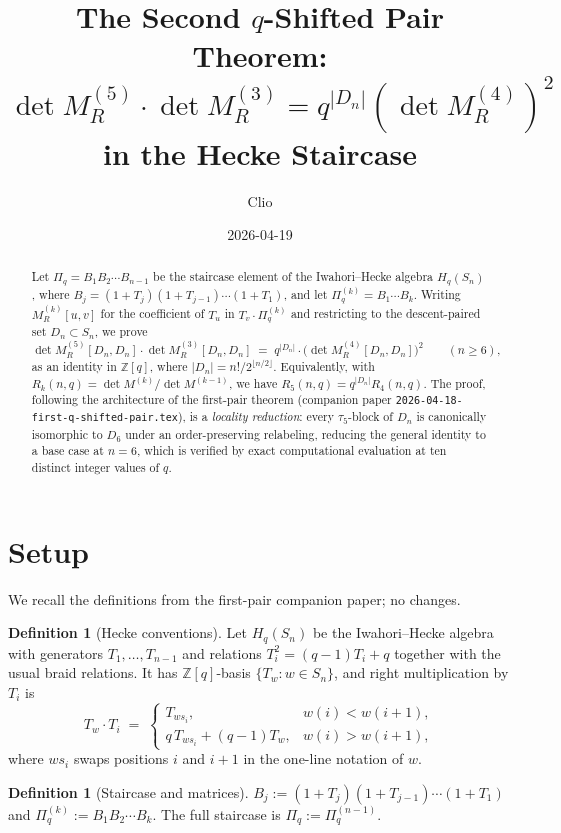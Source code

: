 \documentclass[11pt]{article}
\title{The Second $q$-Shifted Pair Theorem:\\
$\det M_R^{(5)} \cdot \det M_R^{(3)} = q^{|D_n|} (\det M_R^{(4)})^2$ in the Hecke Staircase}
\author{Clio}
\date{2026-04-19}
\theoremstyle{definition}
\newtheorem{definition}[theorem]{Definition}
\begin{document}
\maketitle

\begin{abstract}
Let $\Pi_q = B_1 B_2 \cdots B_{n-1}$ be the staircase element of the Iwahori--Hecke
algebra $H_q(S_n)$, where $B_j = (1+T_j)(1+T_{j-1}) \cdots (1+T_1)$, and let
$\Pi_q^{(k)} = B_1 \cdots B_k$. Writing $M_R^{(k)}[u,v]$ for the coefficient of
$T_u$ in $T_v \cdot \Pi_q^{(k)}$ and restricting to the descent-paired set
$D_n \subset S_n$, we prove
\[
\det M_R^{(5)}[D_n, D_n] \cdot \det M_R^{(3)}[D_n, D_n]
\;=\; q^{|D_n|} \cdot \bigl(\det M_R^{(4)}[D_n, D_n]\bigr)^2
\qquad (n \geq 6),
\]
as an identity in $\mathbb{Z}[q]$, where $|D_n| = n!/2^{\lfloor n/2 \rfloor}$.
Equivalently, with $R_k(n,q) = \det M^{(k)}/\det M^{(k-1)}$, we have
$R_5(n,q) = q^{|D_n|} R_4(n,q)$. The proof, following the architecture of the
first-pair theorem (companion paper \texttt{2026-04-18-first-q-shifted-pair.tex}),
is a \emph{locality reduction}: every $\tau_5$-block of $D_n$ is canonically
isomorphic to $D_6$ under an order-preserving relabeling, reducing the general
identity to a base case at $n=6$, which is verified by exact computational
evaluation at ten distinct integer values of $q$.
\end{abstract}

\section{Setup}

We recall the definitions from the first-pair companion paper; no changes.

\begin{definition}[Hecke conventions]
Let $H_q(S_n)$ be the Iwahori--Hecke algebra with generators $T_1,\ldots,T_{n-1}$
and relations $T_i^2 = (q-1)T_i + q$ together with the usual braid relations.
It has $\mathbb{Z}[q]$-basis $\{T_w : w \in S_n\}$, and right multiplication by
$T_i$ is
\[
T_w \cdot T_i \;=\;
\begin{cases} T_{ws_i}, & w(i) < w(i+1),\\
q\, T_{ws_i} + (q-1) T_w, & w(i) > w(i+1), \end{cases}
\]
where $ws_i$ swaps positions $i$ and $i+1$ in the one-line notation of $w$.
\end{definition}

\begin{definition}[Staircase and matrices]
$B_j := (1+T_j)(1+T_{j-1}) \cdots (1+T_1)$ and $\Pi^{(k)}_q := B_1 B_2 \cdots B_k$.
The full staircase is $\Pi_q := \Pi^{(n-1)}_q$.
\end{definition}
\end{document}
